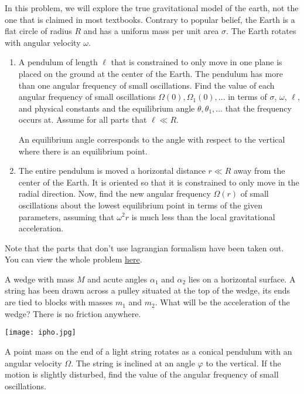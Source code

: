 \documentclass[11pt]{scrartcl}
\begin{document}
\begin{problem}[2020 OPhO]
In this problem, we will explore the true gravitational model of the earth, not the one that is claimed in most textbooks. Contrary to popular belief, the Earth is a flat circle of radius $R$ and has a uniform mass per unit area $\sigma$. The Earth rotates with angular velocity $\omega$.

\begin{enumerate}[label=(\alph*)]
\item A pendulum of length $\ell$ that is constrained to only move in one plane is placed on the ground at the center of the Earth. The pendulum has more than one angular frequency of small oscillations. Find the value of each angular frequency of small oscillations $\Omega (0), \Omega_1 (0), ...$ in terms of $\sigma$, $\omega$, $\ell$, and physical constants and the equilibrium angle $\theta, \theta_1, ...$ that the frequency occurs at. Assume for all parts that $\ell \ll R$.
\vspace{3mm}

\noindent An equilibrium angle corresponds to the angle with respect to the vertical where there is an equilibrium point.

\item The entire pendulum is moved a horizontal distance $r \ll R$ away from the center of the Earth. It is oriented so that it is constrained to only move in the radial direction. Now, find the new angular frequency $\Omega (r)$ of small oscillations about the lowest equilibrium point in terms of the given parameters, assuming that $\omega^2 r$ is much less than the local gravitational acceleration.
\end{enumerate}
Note that the parts that don't use lagrangian formalism have been taken out. You can view the whole problem \href{https://opho.physoly.tech/static/files/opho2020_invi.pdf}{here}.
\end{problem}
\begin{problem}[1971 IPhO]
A wedge with mass $M$ and acute angles $\alpha_1$ and $\alpha_2$ lies on a horizontal surface. A string has been drawn across a pulley situated at the top of the wedge, its ends are tied to blocks with masses $m_1$ and $m_2$. What will be the acceleration of the wedge? There is no friction anywhere.
\begin{center}
    \texttt{[image: ipho.jpg]}
\end{center}
\end{problem}

\begin{problem}
A point mass on the end of a light string rotates as a conical pendulum with an angular velocity $\Omega$. The string is inclined at an angle $\varphi$ to the vertical. If the motion is slightly disturbed, find the value of the angular frequency of small oscillations.
\end{problem}
\end{document}
